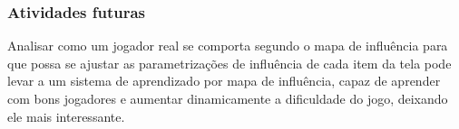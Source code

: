 \documentclass[a4paper]{article}
\begin{document}
\subsubsection{Atividades futuras}

Analisar como um jogador real se comporta segundo o mapa de influência para que possa se ajustar as parametrizações de influência de cada item da tela pode levar a um sistema de aprendizado por mapa de influência, capaz de aprender com bons jogadores e aumentar dinamicamente a dificuldade do jogo, deixando ele mais interessante.




\end{document}
